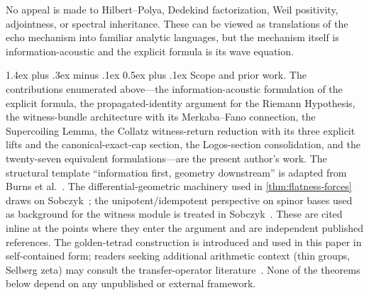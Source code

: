 \documentclass[11pt,a4paper]{article}
\makeatletter
\theoremstyle{plain}
\theoremstyle{definition}
\theoremstyle{remark}
\numberwithin{equation}{section}
\renewcommand{\paragraph}{%
  \@startsection{paragraph}{4}{0pt}%
    {1.4ex plus .3ex minus .1ex}%
    {0.5ex plus .1ex}%
    {\normalfont\normalsize\bfseries\color{headingAccent}}%
}
\makeatother
\begin{document}
No appeal is made to Hilbert--Polya, Dedekind factorization, Weil
positivity, adjointness, or spectral inheritance.  These can be
viewed as translations of the echo mechanism into familiar analytic
languages, but the mechanism itself is information-acoustic and the
explicit formula is its wave equation.

\paragraph{Scope and prior work.}
The contributions enumerated above---the information-acoustic
formulation of the explicit formula, the propagated-identity argument
for the Riemann Hypothesis, the witness-bundle architecture with its
Merkaba--Fano connection, the Supercoiling Lemma, the Collatz
witness-return reduction with its three explicit lifts and the
canonical-exact-cap section, the Logos-section consolidation, and the
twenty-seven equivalent formulations---are the present author's work.
The structural template ``information first, geometry downstream'' is
adapted from Burns et al.~\cite{burns2024}.  The differential-geometric
machinery used in \cref{thm:flatness-forces} draws on
Sobczyk~\cite{sobczyk1971}; the unipotent/idempotent perspective on
spinor bases used as background for the witness module is treated in
Sobczyk~\cite{sobczyk2004}.  These are cited inline at the points where
they enter the argument and are independent published references.  The
golden-tetrad construction is introduced and used in this paper in
self-contained form; readers seeking additional arithmetic context
(thin groups, Selberg zeta) may consult the transfer-operator
literature~\cite{mayer1991,pollicott-sharp,bourgain2010,kontorovich-oh}.
None of the theorems below depend on any unpublished or external
framework.
\end{document}
